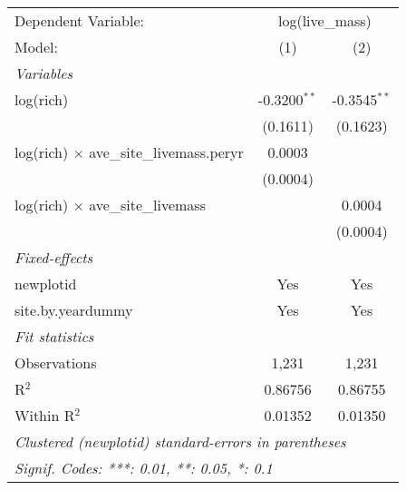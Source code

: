 \begin{tabular}{lcc}
\tabularnewline\midrule\midrule
Dependent Variable:&\multicolumn{2}{c}{log(live\_mass)}\\
Model:&(1) & (2)\\
\midrule \emph{Variables}&   &  \\
log(rich) & -0.3200$^{**}$ & -0.3545$^{**}$\\
  &(0.1611) & (0.1623)\\
log(rich) $\times $ ave\_site\_livemass.peryr & 0.0003 &   \\
  &(0.0004) &   \\
log(rich) $\times $ ave\_site\_livemass &    & 0.0004\\
  &   & (0.0004)\\
\midrule \emph{Fixed-effects}&   &  \\
newplotid & Yes & Yes\\
site.by.yeardummy & Yes & Yes\\
\midrule \emph{Fit statistics}&  & \\
Observations & 1,231&1,231\\
R$^2$ & 0.86756&0.86755\\
Within R$^2$ & 0.01352&0.01350\\
\midrule\midrule\multicolumn{3}{l}{\emph{Clustered (newplotid) standard-errors in parentheses}}\\
\multicolumn{3}{l}{\emph{Signif. Codes: ***: 0.01, **: 0.05, *: 0.1}}\\
\end{tabular}


